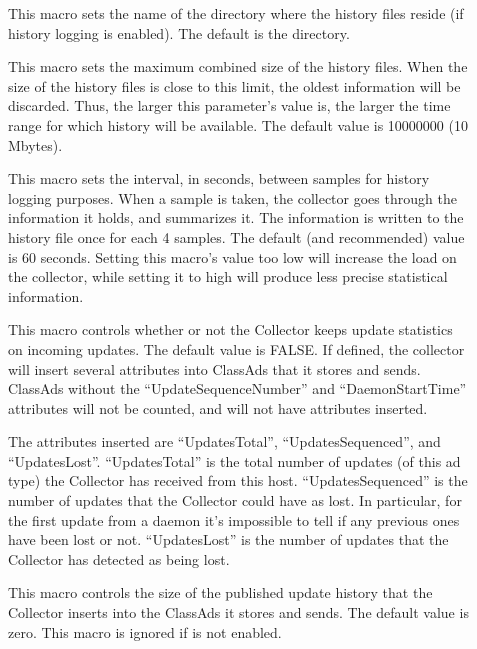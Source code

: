 \begin{description}
\item[] \label{param:PoolHistoryDir}
  This macro sets the name of the directory where the history
  files reside (if history logging is enabled).
  The default is the  directory.

\item[]
  \label{param:PoolHistoryMaxStorage} 
  This macro sets the maximum combined size of the history files.
  When the size of the history files is close to this limit, the oldest
  information will be discarded.
  Thus, the larger this parameter's value is, the larger the time
  range for which history will be available.  The default value is
  10000000 (10 Mbytes).

\item[]
  \label{param:PoolHistorySamplingInterval}
  This macro sets the interval, in seconds, between samples for
  history logging purposes. 
  When a sample is taken, the collector goes through the information
  it holds, and summarizes it.
  The information is written to the history file once for each 4
  samples.
  The default (and recommended) value is 60 seconds. Setting this
  macro's value too low will increase the load on the collector,
  while setting it to high will produce less precise statistical
  information.

\item[]
  \label{param:CollectorDaemonStats}
  This macro controls whether or not the Collector keeps update
  statistics on incoming updates.  The default value is FALSE.  If
  defined, the collector will insert several attributes into ClassAds
  that it stores and sends.  ClassAds without the
  ``UpdateSequenceNumber'' and ``DaemonStartTime'' attributes will not
  be counted, and will not have attributes inserted.

  The attributes inserted are ``UpdatesTotal'', ``UpdatesSequenced'',
  and ``UpdatesLost''.  ``UpdatesTotal'' is the total number of
  updates (of this ad type) the Collector has received from this host.
  ``UpdatesSequenced'' is the number of updates that the Collector
  could have as lost.  In particular, for the first update from a
  daemon it's impossible to tell if any previous ones have been lost
  or not.  ``UpdatesLost'' is the number of updates that the Collector
  has detected as being lost.

\item[]
  \label{param:CollectorDaemonHistorySize} This macro controls the
  size of the published update history that the Collector inserts into
  the ClassAds it stores and sends.  The default value is zero.  This
  macro is ignored if  is not
  enabled.


\end{description}

